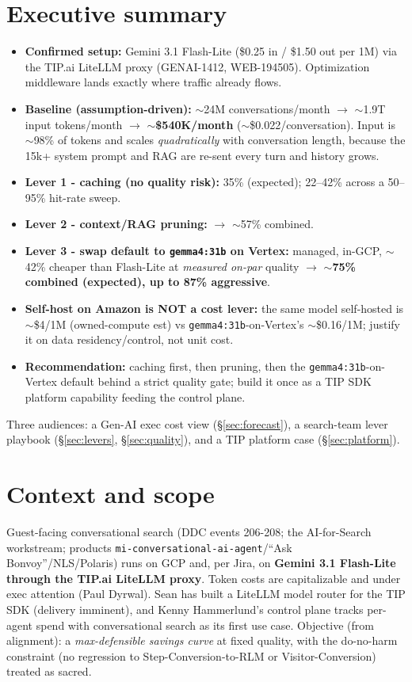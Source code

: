 \documentclass[11pt]{article}
\newcommand{\code}[1]{\texttt{\small #1}}
\begin{document}
\section*{Executive summary}
\begin{itemize}[leftmargin=1.3em,itemsep=2pt]
\item \textbf{Confirmed setup:} Gemini 3.1 Flash-Lite (\$0.25 in / \$1.50 out per 1M) via the
TIP.ai LiteLLM proxy (GENAI-1412, WEB-194505). Optimization middleware lands exactly where
traffic already flows.
\item \textbf{Baseline (assumption-driven):} $\sim$24M conversations/month $\rightarrow$
$\sim$1.9T input tokens/month $\rightarrow$ \textbf{$\sim$\$540K/month} ($\sim$\$0.022/conversation).
Input is $\sim$98\% of tokens and scales \emph{quadratically} with conversation length, because
the 15k+ system prompt and RAG are re-sent every turn and history grows.
\item \textbf{Lever 1 - caching (no quality risk):} 35\% (expected); 22--42\% across a 50--95\%
hit-rate sweep.
\item \textbf{Lever 2 - context/RAG pruning:} $\rightarrow$ $\sim$57\% combined.
\item \textbf{Lever 3 - swap default to \code{gemma4:31b} on Vertex:} managed, in-GCP,
$\sim$42\% cheaper than Flash-Lite at \emph{measured on-par} quality $\rightarrow$ \textbf{$\sim$75\%
combined (expected), up to 87\% aggressive}.
\item \textbf{Self-host on Amazon is NOT a cost lever:} the same model self-hosted is
$\sim$\$4/1M (owned-compute est) vs \code{gemma4:31b}-on-Vertex's $\sim$\$0.16/1M; justify it on
data residency/control, not unit cost.
\item \textbf{Recommendation:} caching first, then pruning, then the \code{gemma4:31b}-on-Vertex
default behind a strict quality gate; build it once as a TIP SDK platform capability feeding the
control plane.
\end{itemize}
Three audiences: a Gen-AI exec cost view (\S\ref{sec:forecast}), a search-team lever playbook
(\S\ref{sec:levers}, \S\ref{sec:quality}), and a TIP platform case (\S\ref{sec:platform}).

\section{Context and scope}
Guest-facing conversational search (DDC events 206-208; the AI-for-Search workstream; products
\code{mi-conversational-ai-agent}/``Ask Bonvoy''/NLS/Polaris) runs on GCP and, per Jira, on
\textbf{Gemini 3.1 Flash-Lite through the TIP.ai LiteLLM proxy}. Token costs are capitalizable
and under exec attention (Paul Dyrwal). Sean has built a LiteLLM model router for the TIP SDK
(delivery imminent), and Kenny Hammerlund's control plane tracks per-agent spend with
conversational search as its first use case. Objective (from alignment): a \emph{max-defensible
savings curve} at fixed quality, with the do-no-harm constraint (no regression to
Step-Conversion-to-RLM or Visitor-Conversion) treated as sacred.
\end{document}
